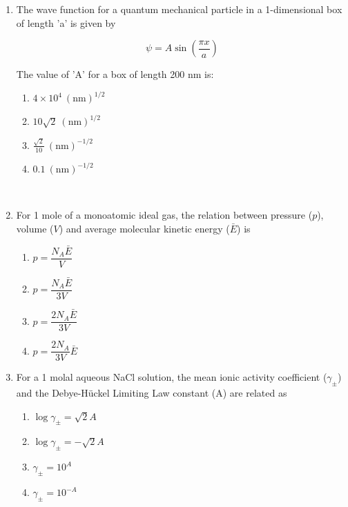 \documentclass[journal,12pt,onecolumn]{IEEEtran}
\theoremstyle{remark}
\begin{document}
\begin{enumerate}
 

\item    \hspace{0.5 cm} The wave function for a quantum mechanical particle in a 1-dimensional box of length 'a' is given by  \hfill{}

\[
\psi = A \sin\left(\frac{\pi x}{a}\right)
\]

The value of 'A' for a box of length 200 nm is:

\begin{multicols}{2}
\begin{enumerate}
    \item $4 \times 10^4 \ (\text{nm})^{1/2}$
    \item $10\sqrt{2} \ (\text{nm})^{1/2}$
    \item $\frac{\sqrt{2}}{10} \ (\text{nm})^{-1/2}$
    \item $0.1 \ (\text{nm})^{-1/2}$
\end{enumerate}
\end{multicols}

\newpage
\

\item    \hspace{0.5cm} For 1 mole of a monoatomic ideal gas, the relation between pressure (\(p\)), volume (\(V\)) and average molecular kinetic energy (\(\bar{E}\)) is  \hfill{}

\begin{multicols}{2}
\begin{enumerate}
    \item \(p = \dfrac{N_A \bar{E}}{V}\)
    \item \(p = \dfrac{N_A \bar{E}}{3V}\)
    \item \(p = \dfrac{2 N_A \bar{E}}{3V}\)
    \item \(p = \dfrac{2 N_A}{3V} \bar{E}\)
\end{enumerate}
\end{multicols}

 

\item    \hspace{0.5cm} For a 1 molal aqueous NaCl solution, the mean ionic activity coefficient (\(\gamma_{\pm}\)) and the Debye-Hückel Limiting Law constant (A) are related as  \hfill{}

\begin{multicols}{2}
\begin{enumerate}
    \item \(\log \gamma_{\pm} = \sqrt{2} A\)
    \item \(\log \gamma_{\pm} = - \sqrt{2} A\)
    \item \(\gamma_{\pm} = 10^A\)
    \item \(\gamma_{\pm} = 10^{-A}\)
\end{enumerate}
\end{multicols}


\end{enumerate}
\end{document}
